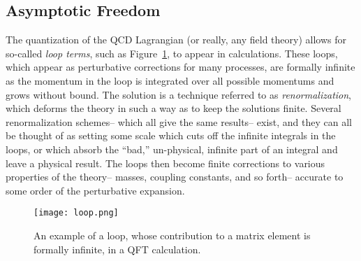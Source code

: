 \subsection{Asymptotic Freedom}
\label{chapter:sm:qcd:freedom}
The quantization of the QCD Lagrangian (or really, any field theory) allows for so-called \textit{loop terms}, such as Figure~\ref{fig:sm:loop}, to appear in calculations. These loops, which appear as perturbative corrections for many processes, are formally infinite as the momentum in the loop is integrated over all possible momentums and grows without bound. The solution is a technique referred to as \textit{renormalization}, which deforms the theory in such a way as to keep the solutions finite. Several renormalization schemes-- which all give the same results-- exist, and they can all be thought of as setting some scale which cuts off the infinite integrals in the loops, or which absorb the ``bad,'' un-physical, infinite part of an integral and leave a physical result. The loops then become finite corrections to various properties of the theory-- masses, coupling constants, and so forth-- accurate to some order of the perturbative expansion.


\begin{figure}
\centering
\texttt{[image: loop.png]}
\label{fig:sm:loop}
\caption{An example of a loop, whose contribution to a matrix element is formally infinite, in a QFT calculation.}
\end{figure}


